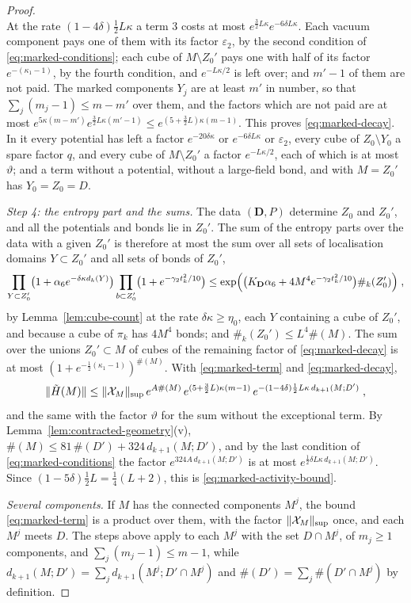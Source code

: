 \documentclass[11pt]{preprint}
\DeclarePairedDelimiter{\norm}{\lVert}{\rVert}
\numberwithin{equation}{section}
\theoremstyle{definition}
\theoremstyle{remark}
\theoremstyle{plain}
\begin{document}
\begin{proof}
\[\]
At the rate $(1 - 4\delta)\frac12L\kappa$ a term $3$ costs at most $e^{\frac32L\kappa}e^{-6\delta L\kappa}$. Each vacuum component pays one of them with its factor $\varepsilon_2$, by the second condition of \eqref{eq:marked-conditions}; each cube of $M \setminus Z_0'$ pays one with half of its factor $e^{-(\kappa_1 - 1)}$, by the fourth condition, and $e^{-L\kappa/2}$ is left over; and $m' - 1$ of them are not paid. The marked components $Y_j$ are at least $m'$ in number, so that $\sum_j(m_j - 1) \leq m - m'$ over them, and the factors which are not paid are at most $e^{5\kappa(m - m')}e^{\frac32L\kappa(m' - 1)} \leq e^{(5 + \frac32L)\kappa(m - 1)}$. This proves \eqref{eq:marked-decay}. In it every potential has left a factor $e^{-20\delta\kappa}$ or $e^{-6\delta L\kappa}$ or $\varepsilon_2$, every cube of $Z_0 \setminus Y_0$ a spare factor $q$, and every cube of $M \setminus Z_0'$ a factor $e^{-L\kappa/2}$, each of which is at most $\vartheta$; and a term without a potential, without a large-field bond, and with $M = Z_0'$ has $Y_0 = Z_0 = D$.

\emph{Step 4: the entropy part and the sums.} The data $(\mathbf D, P)$ determine $Z_0$ and $Z_0'$, and all the potentials and bonds lie in $Z_0'$. The sum of the entropy parts over the data with a given $Z_0'$ is therefore at most the sum over all sets of localisation domains $Y \subset Z_0'$ and all sets of bonds of $Z_0'$,
\[
    \prod_{Y \subset Z_0'}\bigl(1 + \alpha_6e^{-\delta\kappa d_k(Y)}\bigr)\prod_{b \subset Z_0'}\bigl(1 + e^{-\gamma_2t_k^2/10}\bigr) \leq \exp\Bigl(\bigl(K_{\mathbf D}\alpha_6 + 4M^4e^{-\gamma_2t_k^2/10}\bigr)\#_k(Z_0')\Bigr)\;,
\]
by Lemma~\ref{lem:cube-count} at the rate $\delta\kappa \geq \eta_0$, each $Y$ containing a cube of $Z_0'$, and because a cube of $\pi_k$ has $4M^4$ bonds; and $\#_k(Z_0') \leq L^4\#(M)$. The sum over the unions $Z_0' \subset M$ of cubes of the remaining factor of \eqref{eq:marked-decay} is at most $(1 + e^{-\frac12(\kappa_1 - 1)})^{\#(M)}$. With \eqref{eq:marked-term} and \eqref{eq:marked-decay},
\[
    \norm{\tilde H(M)} \leq \norm{\mathcal X_M}_{\sup}\,e^{A\#(M)}\,e^{(5 + \frac32L)\kappa(m - 1)}\,e^{-(1 - 4\delta)\frac12L\kappa\,d_{k+1}(M; D')}\;,
\]
and the same with the factor $\vartheta$ for the sum without the exceptional term. By Lemma~\ref{lem:contracted-geometry}(v), $\#(M) \leq 81\,\#(D') + 324\,d_{k+1}(M; D')$, and by the last condition of \eqref{eq:marked-conditions} the factor $e^{324A\,d_{k+1}(M; D')}$ is at most $e^{\frac12\delta L\kappa\,d_{k+1}(M; D')}$. Since $(1 - 5\delta)\frac12L = \frac14(L + 2)$, this is \eqref{eq:marked-activity-bound}.

\emph{Several components.} If $M$ has the connected components $M^j$, the bound \eqref{eq:marked-term} is a product over them, with the factor $\norm{\mathcal X_M}_{\sup}$ once, and each $M^j$ meets $D$. The steps above apply to each $M^j$ with the set $D \cap M^j$, of $m_j \geq 1$ components, and $\sum_j(m_j - 1) \leq m - 1$, while $d_{k+1}(M; D') = \sum_jd_{k+1}(M^j; D' \cap M^j)$ and $\#(D') = \sum_j\#(D' \cap M^j)$ by definition.
\end{proof}
\end{document}
